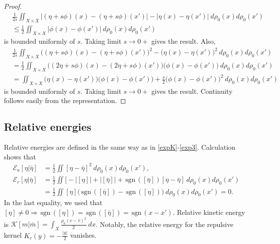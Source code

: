 \documentclass[10pt, letterpaper]{article}
\def\E{{\mathcal{E}}}
\def\K{{\mathcal{K}}}
\def\drr{{d\rho_0(x)d\rho_0(x')}}
\def\sgn{\,\textrm{sgn}\,}
\theoremstyle{definition}
\theoremstyle{remark}
\begin{document}
\begin{proof}
\begin{align*}
  &\frac{1}{2s}\iint_{X\times X} \Big| (\eta + s\phi)(x) - (\eta + s\phi)(x')\Big|- \Big|\eta(x) - \eta(x')\Big| \: d\rho_0(x)d\rho_0(x') \\
  &\le  \frac{1}{2}\iint_{X\times X}\Big|\phi(x) - \phi(x')\Big| \: \drr%
\end{align*}
is bounded uniformly of $s$. Taking limit $s \rightarrow 0+$ gives the result. Also,
\begin{align*}
 &\frac{1}{2s}\iint_{X\times X} \Big( (\eta + s\phi)(x) - (\eta + s\phi)(x')\Big)^2- \Big(\eta(x) - \eta(x')\Big)^2 \: d\rho_0(x)d\rho_0(x') \\
  &= \frac{1}{2} \iint_{X\times X}\Big( (2\eta + s\phi)(x) - (2\eta + s\phi)(x')\Big)\Big(\phi(x)-\phi(x')\Big)\: d\rho_0(x)d\rho_0(x')\\
  &= \iint_{X\times X} \Big( \eta(x) - \eta(x')\Big)\Big(\phi(x)-\phi(x')\Big) + \frac{s}{2} \Big(\phi(x)-\phi(x')\Big)^2  \: d\rho_0(x)d\rho_0(x')%
\end{align*}
is bounded uniformly of $s$. Taking limit $s \rightarrow 0+$ gives the result. Continuity follows easily from the representation. %
\end{proof}


\subsection{Relative energies}
Relative energies are defined in the same way as in \eqref{expK}-\eqref{exp3}. Calculation shows that
\begin{align*}
 \E_a[\eta|\bar\eta] &= \frac{1}{2}\iint [\eta-\bar\eta]^2\:\drr,\\
 \E_r[\eta|\bar\eta] &= \frac{1}{2}\iint \Big[ -|[\eta]| + |[\bar\eta]| +\sgn([\bar\eta])[\eta-\bar\eta] \:\drr\\
  &= \frac{1}{2}\iint [\eta]\Big(\sgn([\bar\eta]) - \sgn([\eta])\Big)\:\drr = 0.
\end{align*}
In the last equality, we used that $[\eta]\ne 0 \Longrightarrow \sgn([\eta])=\sgn([\bar\eta]) = \sgn(x-x')$. Relative kinetic energy is $\displaystyle\K[m|\bar m]  = \int_X \frac{\rho_0(v-\bar v)^2}{2} \: dx$. Notably, the relative energy for the repulsive kernel $K_r(y) = -\frac{|y|}{2}$ vanishes.
\end{document}

